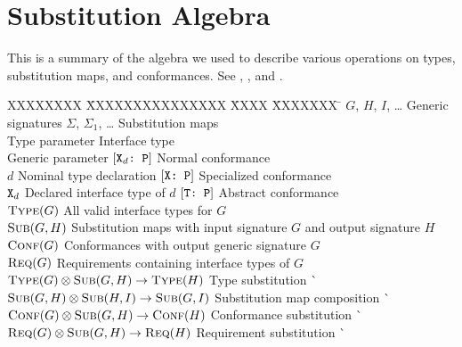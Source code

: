 \documentclass[../generics]{subfiles}
\begin{document}
\chapter{Substitution Algebra}\label{notation summary}

This is a \index{$\otimes$}summary of the algebra we used to describe various operations on types, substitution maps, and conformances. See , , and .

\begin{tabbing}
XXXXXXXX \= XXXXXXXXXXXXXXX \= XXXX \= XXXXXXX \= \kill
$G$, $H$, $I$, \ldots \> Generic signatures \> \> $\Sigma$, $\Sigma_1$, \ldots \> Substitution maps \\
\tT \> Type parameter \> \> \tX \> Interface type\\
 \> Generic parameter \> \> $[\texttt{$\texttt{X}_d$:~P}]$ \> Normal conformance\\
$d$ \> Nominal type declaration \> \> $[\texttt{X:~P}]$ \> Specialized conformance\\
$\texttt{X}_d$ \> Declared interface type of $d$ \> \> $[\texttt{T:~P}]$ \> Abstract conformance\\[\medskipamount]
$\textsc{Type}({G})$ \> All valid interface types for $G$\\
$\textsc{Sub}({G, H})$ \> Substitution maps with input signature $G$ and output signature $H$\\
$\textsc{Conf}({G})$ \> Conformances with output generic signature $G$\\
$\textsc{Req}({G})$ \> Requirements containing interface types of $G$\\[\bigskipamount]
$\textsc{Type}({G})\otimes\textsc{Sub}({G, H})\rightarrow\textsc{Type}({H})$ \> \> Type substitution \` \\
$\textsc{Sub}({G, H})\otimes\textsc{Sub}({H, I})\rightarrow\textsc{Sub}({G, I})$ \> \> Substitution map composition \` \\
$\textsc{Conf}({G})\otimes\textsc{Sub}({G, H})\rightarrow\textsc{Conf}({H})$ \> \> Conformance substitution \` \\
$\textsc{Req}({G})\otimes\textsc{Sub}({G, H})\rightarrow\textsc{Req}({H})$ \> \> Requirement substitution \` 
\end{tabbing}
\end{document}
